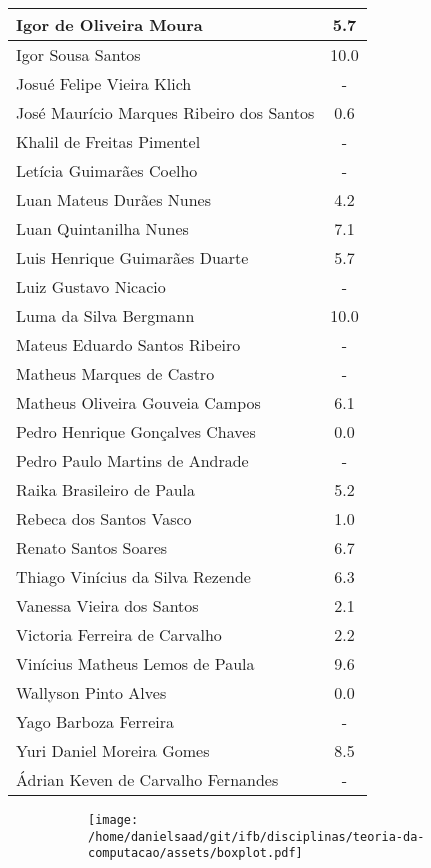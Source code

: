 \documentclass{article}
\begin{document}
\begin{longtable}{|l|c|}
Igor de Oliveira Moura & 5.7\\\hline
Igor Sousa Santos & 10.0\\\hline
Josué Felipe Vieira Klich & -\\\hline
José Maurício Marques Ribeiro dos Santos & 0.6\\\hline
Khalil de Freitas Pimentel & -\\\hline
Letícia Guimarães Coelho & -\\\hline
Luan Mateus Durães Nunes & 4.2\\\hline
Luan Quintanilha Nunes & 7.1\\\hline
Luis Henrique Guimarães Duarte & 5.7\\\hline
Luiz Gustavo Nicacio & -\\\hline
Luma da Silva Bergmann & 10.0\\\hline
Mateus Eduardo Santos Ribeiro & -\\\hline
Matheus Marques de Castro & -\\\hline
Matheus Oliveira Gouveia Campos & 6.1\\\hline
Pedro Henrique Gonçalves Chaves & 0.0\\\hline
Pedro Paulo Martins de Andrade & -\\\hline
Raika Brasileiro de Paula & 5.2\\\hline
Rebeca dos Santos Vasco & 1.0\\\hline
Renato Santos Soares & 6.7\\\hline
Thiago Vinícius da Silva Rezende & 6.3\\\hline
Vanessa Vieira dos Santos & 2.1\\\hline
Victoria Ferreira de Carvalho & 2.2\\\hline
Vinícius Matheus Lemos de Paula & 9.6\\\hline
Wallyson Pinto Alves & 0.0\\\hline
Yago Barboza Ferreira & -\\\hline
Yuri Daniel Moreira Gomes & 8.5\\\hline
Ádrian Keven de Carvalho Fernandes & -\\\hline
\end{longtable}
\begin{figure}[h!]
\centering\begin{subfigure}
        \centering
        \texttt{[image: /home/danielsaad/git/ifb/disciplinas/teoria-da-computacao/assets/boxplot.pdf]}
    \end{subfigure}\end{figure}
\end{document}
